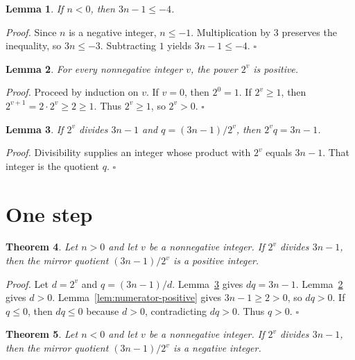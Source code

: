 \documentclass[11pt,letterpaper]{article}
\newtheorem{theorem}{Theorem}
\newtheorem{lemma}[theorem]{Lemma}
\newenvironment{proof}{\noindent\textit{Proof.}}{\hfill\(\square\)}
\begin{document}
\begin{lemma}
\label{lem:numerator-negative}
If \(n<0\), then \(3n-1\le -4\).
\end{lemma}

\begin{proof}
Since \(n\) is a negative integer, \(n\le -1\). Multiplication by \(3\) preserves the inequality, so \(3n\le -3\). Subtracting \(1\) yields \(3n-1\le -4\).
\end{proof}

\begin{lemma}
\label{lem:denominator}
For every nonnegative integer \(v\), the power \(2^{v}\) is positive.
\end{lemma}

\begin{proof}
Proceed by induction on \(v\). If \(v=0\), then \(2^{0}=1\). If \(2^{v}\ge 1\), then \(2^{v+1}=2\cdot 2^{v}\ge 2\ge 1\). Thus \(2^{v}\ge 1\), so \(2^{v}>0\).
\end{proof}

\begin{lemma}
\label{lem:reconstruct}
If \(2^{v}\) divides \(3n-1\) and \(q=(3n-1)/2^{v}\), then \(2^{v}q=3n-1\).
\end{lemma}

\begin{proof}
Divisibility supplies an integer whose product with \(2^{v}\) equals \(3n-1\). That integer is the quotient \(q\).
\end{proof}

\section{One step}

\begin{theorem}
\label{thm:quotient-positive}
Let \(n>0\) and let \(v\) be a nonnegative integer. If \(2^{v}\) divides \(3n-1\), then the mirror quotient \((3n-1)/2^{v}\) is a positive integer.
\end{theorem}

\begin{proof}
Let \(d=2^{v}\) and \(q=(3n-1)/d\). Lemma~\ref{lem:reconstruct} gives \(dq=3n-1\). Lemma~\ref{lem:denominator} gives \(d>0\). Lemma~\ref{lem:numerator-positive} gives \(3n-1\ge 2>0\), so \(dq>0\). If \(q\le 0\), then \(dq\le 0\) because \(d>0\), contradicting \(dq>0\). Thus \(q>0\).
\end{proof}

\begin{theorem}
\label{thm:quotient-negative}
Let \(n<0\) and let \(v\) be a nonnegative integer. If \(2^{v}\) divides \(3n-1\), then the mirror quotient \((3n-1)/2^{v}\) is a negative integer.
\end{theorem}
\end{document}
